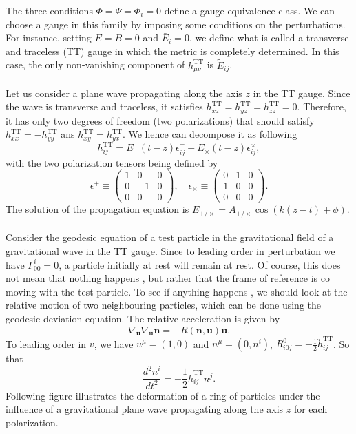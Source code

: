 The three conditions $\Phi = \Psi = \bar{\Phi}_i = 0$ define a gauge equivalence class. We can choose a gauge in this family by imposing some conditions on the perturbations. For instance, setting $E = B = 0$ and $\bar{E}_i = 0$, we define what is called a transverse and traceless (TT) gauge in which the metric is completely determined. In this case, the only non-vanishing component of $h_{\mu\nu}^{\mathrm{TT}}$ is $\tilde{E}_{ij}$.
\\ \\
Let us consider a plane wave propagating along the axis $z$ in the TT gauge. Since the wave is transverse and traceless, it satisfies $h_{xz}^{\mathrm{TT}} = h_{yz}^{\mathrm{TT}} = h_{zz}^{\mathrm{TT}} = 0$. Therefore, it has only two degrees of freedom (two polarizations) that should satisfy $h_{xx}^{\mathrm{TT}} = - h_{yy}^{\mathrm{TT}}$ ans $h_{xy}^{\mathrm{TT}} = h_{yx}^{\mathrm{TT}}$. We hence can decompose it as following
\[h_{ij}^{\mathrm{TT}} = E_+(t-z)\epsilon^+_{ij} + E_{\times}(t-z)\epsilon^{\times}_{ij},\]
with the two polarization tensors being defined by
\[\epsilon^+ \equiv \begin{pmatrix}
1 & 0 & 0\\ 0 & -1 & 0 \\ 0 & 0 & 0
\end{pmatrix} , \quad \epsilon_{\times} \equiv \begin{pmatrix}
0 & 1 & 0\\ 1 & 0 & 0 \\ 0 & 0 & 0
\end{pmatrix} .\]
The solution of the propagation equation is $E_{+ / \times} = A_{+ / \times}\cos(k(z-t)+ \phi)$.
\\ \\
Consider the geodesic equation of a test particle in the gravitational field of a gravitational wave in the TT gauge. Since to leading order in perturbation we have $\Gamma^i_{00} = 0$, a particle initially at rest will remain at rest.
Of course, this does not mean that nothing happens , but rather that the frame of reference is co moving with the test particle. To see if anything happens , we should look at the relative motion of two neighbouring particles, which can be done using the geodesic deviation equation. The relative acceleration is given by
\[\nabla_{\bm{u}} \nabla_{\bm{u}} \bm{n} = -R(\bm{n},\bm{u}) \bm{u}.\]
To leading order in $v$, we have $u^{\mu} = (1,0)$ and $n^{\mu} = (0,n^i)$, $R^0_{i0j} = -\frac{1}{2}\ddot{h}_{ij}^{\mathrm{TT}}$. So that
\[\frac{d^2n^i}{dt^2} = -\frac{1}{2} \ddot{h}_{ij} ^{\mathrm{TT}} n^j.\]
Following figure illustrates the deformation of a ring of particles under the influence of a gravitational plane wave propagating along the axis $z$ for each polarization.

